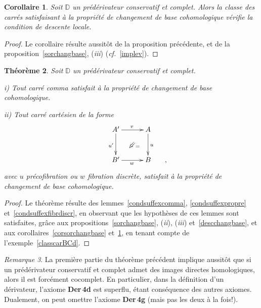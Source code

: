 \documentclass[francais]{smfart}
\theoremstyle{plain}
\newtheorem{thm}{Th\'eor\`eme}[section]
\newtheorem{cor}[thm]{Corollaire}
\theoremstyle{remark}
\newtheorem{rem}[thm]{Remarque}
\theoremstyle{definition}
\numberwithin{equation}{thm}
\begin{document}
\begin{cor} \label{desclocchangbase}
Soit ${\mathbb{D}}$ un prédérivateur conservatif et complet. Alors la classe des carrés satisfaisant à la propriété de changement de base cohomologique vérifie la condition de descente locale.
\end{cor}

\begin{proof}
Le corollaire résulte aussitôt de la proposition précédente, et de la proposition~\ref{sorchangbase}, (\emph{iii}) ({\emph{cf.}}~\ref{implev}).
\end{proof}

\begin{thm} \label{derfgchangbase}
Soit ${\mathbb{D}}$ un prédérivateur conservatif et complet.
\smallskip

\emph{i)} Tout carré comma satisfait à la propriété de changement de base cohomologique.
\smallbreak

\emph{ii)} Tout carré cartésien de la forme
\[
\UseTwocells
\xymatrixcolsep{2.5pc}
\xymatrixrowsep{2.4pc}
\xymatrix{
&A'\ar[d]_{u'}\ar[r]^{v}
\drtwocell<\omit>{}
&A\ar[d]^{u}\ar@<-2ex>@{}[d]_(.55){=}
\\
&B'\ar[r]_{w}
&B
&\hskip -30pt,
}
\]
avec $u$ précofibration ou $w$ fibration discrète, satisfait à la propriété de changement de base cohomologique.
\end{thm}

\begin{proof}
Le théorème résulte des lemmes~\ref{condsuffexcomma}, \ref{condsuffexpropre} et~\ref{condsuffexfibrdiscr}, en observant que les hypothèses de ces lemmes sont satisfaites, grâce aux propositions~\ref{sorchangbase}, (\emph{ii}), (\emph{iii}) et~\ref{descchangbase}, et aux corollaires~\ref{corsorchangbase} et~\ref{desclocchangbase}, en tenant compte de l'exemple~\ref{classcarBCd}.
\end{proof}

\begin{rem}
La première partie du théorème précédent implique aussitôt que si un prédérivateur conservatif et complet admet des images directes homologiques, alors il est forcément cocomplet. En particulier, dans la définition d'un dérivateur, l'axiome \textbf{Der\,4d} est superflu, étant conséquence des autres axiomes. Dualement, on peut omettre l'axiome \textbf{Der\,4g} (mais pas les deux à la fois!).
\end{rem}
\end{document}

